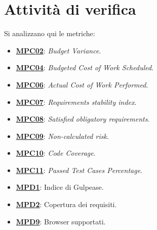 \section{Attività di verifica}
Si analizzano qui le metriche:
\begin{itemize}
    \item \hyperref[s:mpc02]{\textbf{MPC02}}\textbf{}: \textit{Budget Variance}.
    \item \hyperref[s:mpc04]{\textbf{MPC04}}\textbf{}: \textit{Budgeted Cost of Work Scheduled}.
    \item \hyperref[s:mpc06]{\textbf{MPC06}}\textbf{}: \textit{Actual Cost of Work Performed}.
    \item \hyperref[s:mpc07]{\textbf{MPC07}}\textbf{}: \textit{Requirements stability index}.
    \item \hyperref[s:mpc08]{\textbf{MPC08}}\textbf{}: \textit{Satisfied obligatory requirements}.
    \item \hyperref[s:mpc09]{\textbf{MPC09}}\textbf{}: \textit{Non-calculated risk}.
    \item \hyperref[s:mpc10]{\textbf{MPC10}}\textbf{}: \textit{Code Coverage}.
    \item \hyperref[s:mpc11]{\textbf{MPC11}}\textbf{}: \textit{Passed Test Cases Percentage}.
    \item \hyperref[s:mpd1]{\textbf{MPD1}}\textbf{}: Indice di Gulpease.
    \item \hyperref[s:mpd2]{\textbf{MPD2}}\textbf{}: Copertura dei requisiti.
    \item \hyperref[s:mpd9]{\textbf{MPD9}}\textbf{}: Browser supportati.

\end{itemize}
\newpage


